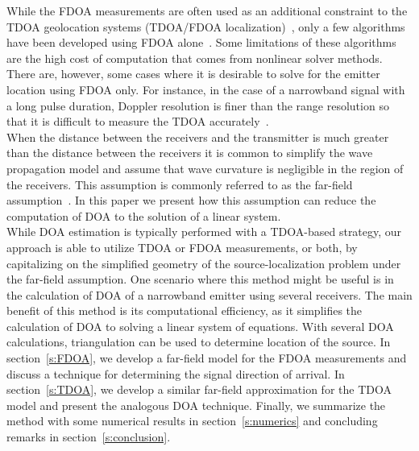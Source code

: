 While the FDOA measurements are often used as an additional constraint to the TDOA geolocation systems (TDOA/FDOA localization)~\cite{Ho1997}, only a few algorithms have been developed using FDOA alone~\cite{Cameron,Jinzhou2012}. Some limitations of these algorithms are the high cost of computation that comes from nonlinear solver methods. There are, however, some cases where it is desirable to solve for the emitter location using FDOA only. For instance, in the case of a narrowband signal with a long pulse duration, Doppler resolution is finer than the range resolution so that it is difficult to measure the TDOA accurately~\cite{Cheney2009,Mason2005,Jinzhou2012}. \\

When the distance between the receivers and the transmitter is much greater than the distance between the receivers it is common to simplify the wave propagation model and assume that wave curvature is negligible in the region of the receivers. This assumption is commonly referred to as the far-field assumption~\cite{Cheney2009}. In this paper we present how this assumption can reduce the computation of DOA to the solution of a linear system. \\

While DOA estimation is typically performed with a TDOA-based strategy, our approach is able to utilize TDOA or FDOA measurements, or both, by capitalizing on the simplified geometry of the source-localization problem under the far-field assumption. One scenario where this method might be useful is in the calculation of DOA of a narrowband emitter using several receivers. The main benefit of this method is its computational efficiency, as it simplifies the calculation of DOA to solving a linear system of equations.  With several DOA calculations, triangulation can be used to determine location of the source. In section~\ref{s:FDOA}, we develop a far-field model for the FDOA measurements and discuss a technique for determining the signal direction of arrival. In section~\ref{s:TDOA}, we develop a similar far-field approximation for the TDOA model and present the analogous DOA technique. Finally, we summarize the method with some numerical results in section~\ref{s:numerics} and concluding remarks in section~\ref{s:conclusion}.

